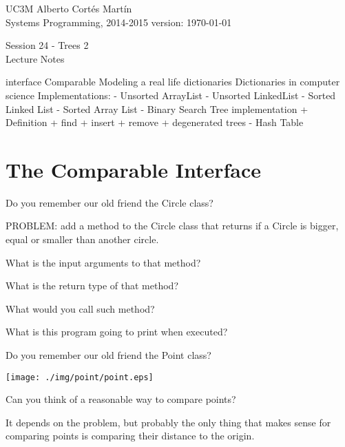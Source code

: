 \documentclass[a4paper, 9pt]{extarticle}
\newcommand{\realtitle}{Session 24 - Trees 2}
\newcommand{\separator}{\begin{center}%
\noindent\makebox[\linewidth]{\rule{0.75\paperwidth}{0.4pt}}%
\end{center}}
\begin{document}
\makebox[\linewidth]{\rule{\textwidth}{0.4pt}}
UC3M \hfill Alberto Cortés Martín\\
Systems Programming, 2014-2015 \hfill version: \today\\
\makebox[\linewidth]{\rule{\textwidth}{0.4pt}}
\begin{center}
  \Large{\realtitle}\\Lecture Notes
\end{center}
\makebox[\linewidth]{\rule{\textwidth}{0.4pt}}
\vspace{1cm}

\begin{blackboard}
interface Comparable
Modeling a real life dictionaries
Dictionaries in computer science
Implementations:
 - Unsorted ArrayList
 - Unsorted LinkedList
 - Sorted Linked List
 - Sorted Array List
 - Binary Search Tree implementation
   + Definition
   + find
   + insert
   + remove
   + degenerated trees
 - Hash Table
\end{blackboard}


\section{The Comparable Interface}

Do you remember our old friend the Circle class?


PROBLEM: add a method to the Circle class that returns if a Circle is bigger, equal or smaller than another circle.

What is the input arguments to that method?

What is the return type of that method?

What would you call such method?


What is this program going to print when executed?

\separator

Do you remember our old friend the Point class?

\begin{center}
  \texttt{[image: ./img/point/point.eps]}
\end{center}

Can you think of a reasonable way to compare points?

It depends on the problem, but probably the only thing that makes sense for
comparing points is comparing their distance to the origin.
\end{document}
